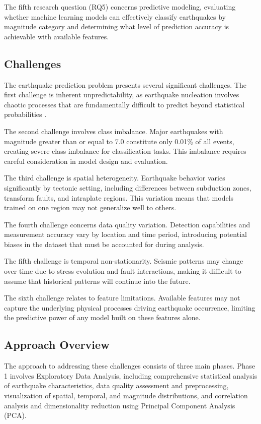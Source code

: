 The fifth research question (RQ5) concerns predictive modeling, evaluating whether machine learning models can effectively classify earthquakes by magnitude category and determining what level of prediction accuracy is achievable with available features.

\subsection{Challenges}

The earthquake prediction problem presents several significant challenges. The first challenge is inherent unpredictability, as earthquake nucleation involves chaotic processes that are fundamentally difficult to predict beyond statistical probabilities \cite{rundle2003}.

The second challenge involves class imbalance. Major earthquakes with magnitude greater than or equal to 7.0 constitute only 0.01\% of all events, creating severe class imbalance for classification tasks. This imbalance requires careful consideration in model design and evaluation.

The third challenge is spatial heterogeneity. Earthquake behavior varies significantly by tectonic setting, including differences between subduction zones, transform faults, and intraplate regions. This variation means that models trained on one region may not generalize well to others.

The fourth challenge concerns data quality variation. Detection capabilities and measurement accuracy vary by location and time period, introducing potential biases in the dataset that must be accounted for during analysis.

The fifth challenge is temporal non-stationarity. Seismic patterns may change over time due to stress evolution and fault interactions, making it difficult to assume that historical patterns will continue into the future.

The sixth challenge relates to feature limitations. Available features may not capture the underlying physical processes driving earthquake occurrence, limiting the predictive power of any model built on these features alone.

\subsection{Approach Overview}

The approach to addressing these challenges consists of three main phases. Phase 1 involves Exploratory Data Analysis, including comprehensive statistical analysis of earthquake characteristics, data quality assessment and preprocessing, visualization of spatial, temporal, and magnitude distributions, and correlation analysis and dimensionality reduction using Principal Component Analysis (PCA).

